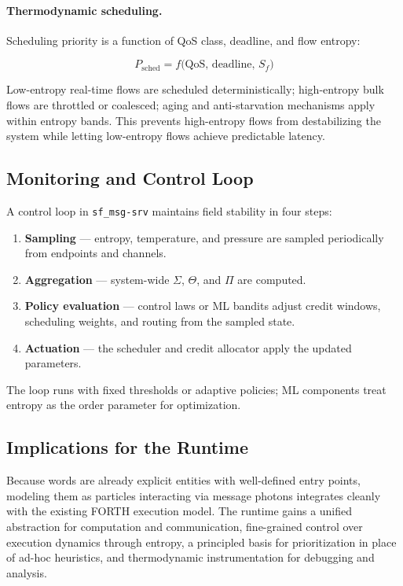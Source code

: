 \paragraph{Thermodynamic scheduling.} Scheduling priority is a function of QoS class,
deadline, and flow entropy:

\begin{equation}
P_{\text{sched}} = f\bigl(\text{QoS},\, \text{deadline},\, S_f\bigr)
\end{equation}

Low-entropy real-time flows are scheduled deterministically; high-entropy bulk flows
are throttled or coalesced; aging and anti-starvation mechanisms apply within entropy
bands. This prevents high-entropy flows from destabilizing the system while letting
low-entropy flows achieve predictable latency.

\subsection{Monitoring and Control Loop}

A control loop in \texttt{sf\_msg-srv} maintains field stability in four steps:

\begin{enumerate}
  \item \textbf{Sampling} --- entropy, temperature, and pressure are sampled
        periodically from endpoints and channels.
  \item \textbf{Aggregation} --- system-wide $\Sigma$, $\Theta$, and $\Pi$ are
        computed.
  \item \textbf{Policy evaluation} --- control laws or ML bandits adjust credit
        windows, scheduling weights, and routing from the sampled state.
  \item \textbf{Actuation} --- the scheduler and credit allocator apply the updated
        parameters.
\end{enumerate}

The loop runs with fixed thresholds or adaptive policies; ML components treat entropy
as the order parameter for optimization.

\subsection{Implications for the Runtime}

Because words are already explicit entities with well-defined entry points, modeling
them as particles interacting via message photons integrates cleanly with the
existing FORTH execution model. The runtime gains a unified abstraction for
computation and communication, fine-grained control over execution dynamics through
entropy, a principled basis for prioritization in place of ad-hoc heuristics, and
thermodynamic instrumentation for debugging and analysis.

